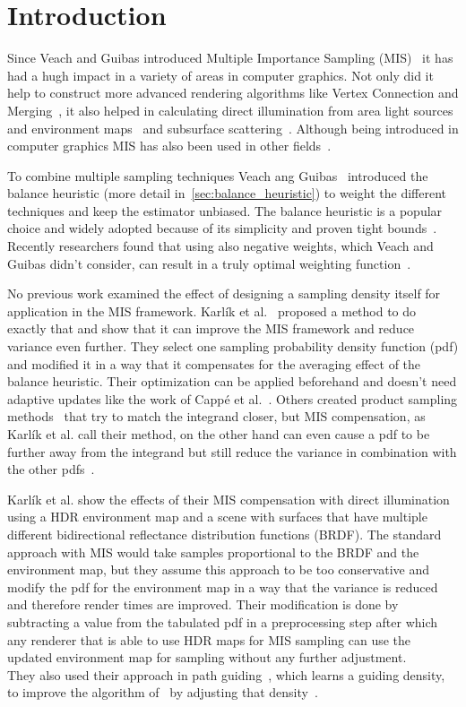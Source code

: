 \chapter{Introduction}
\label{ch:introduction}
Since Veach and Guibas introduced Multiple Importance Sampling (MIS)~\cite{veach_guibas}
it has had a hugh impact in a variety of areas in computer graphics.
Not only did it help to construct more advanced rendering algorithms like Vertex Connection and Merging~\cite{vcm},
it also helped in calculating direct illumination from area light sources and environment maps~\cite[Chapter~14.3]{pbr-book}
and subsurface scattering~\cite{King}.
Although being introduced in computer graphics MIS has also been used in other fields~\cite{he}.

To combine multiple sampling techniques Veach ang Guibas~\cite{veach_guibas} introduced the balance heuristic (more detail in~\ref{sec:balance_heuristic})
to weight the different techniques and keep the estimator unbiased.
The balance heuristic is a popular choice and widely adopted because of its simplicity
and proven tight bounds~\cite[Theorem~9.2]{veach-thesis}.
Recently researchers found that using also negative weights,
which Veach and Guibas didn't consider,
can result in a truly optimal weighting function~\cite{Kondapaneni2019}.

No previous work examined the effect of designing a sampling density itself for application in the MIS framework.
Karl\'ik et al.~\cite{Karlik2019} proposed a method to do exactly that and show that it can improve the MIS framework and reduce variance even further.
They select one sampling probability density function (pdf)
and modified it in a way that it compensates for the averaging effect of the balance heuristic.
Their optimization can be applied beforehand and doesn't need adaptive updates like the work of Capp\'e et al.~\cite{Cappe2008}.
Others created product sampling methods~\cite{Herholz} that try to match the integrand closer,
but MIS compensation, as Karl\'ik et al. call their method,
on the other hand can even cause a pdf to be further away from the integrand but still reduce the variance in combination with the other pdfs~\cite{Karlik2019}.

Karl\'ik et al. show the effects of their MIS compensation with direct illumination using a HDR environment map
and a scene with surfaces that have multiple different bidirectional reflectance distribution functions (BRDF).
The standard approach with MIS would take samples proportional to the BRDF and the environment map,
but they assume this approach to be too conservative and modify the pdf for the environment map in a way that the variance is reduced
and therefore render times are improved.
Their modification is done by subtracting a value from the tabulated pdf in a preprocessing step
after which any renderer that is able to use HDR maps for MIS sampling can use the updated environment map for sampling without any further adjustment.\\
They also used their approach in path guiding~\cite{Vorba_2019},
which learns a guiding density,
to improve the algorithm of~\cite{mueller2017} by adjusting that density~\cite{Karlik2019}.

